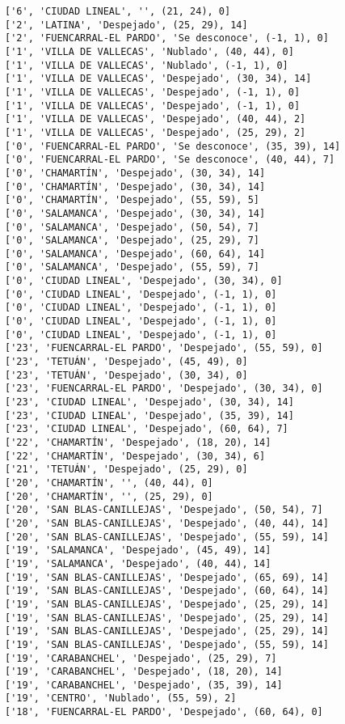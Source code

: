 \documentclass[11pt]{article}
\begin{document}
\begin{Verbatim}[commandchars=\\\{\}]
['6', 'CIUDAD LINEAL', '', (21, 24), 0]
['2', 'LATINA', 'Despejado', (25, 29), 14]
['2', 'FUENCARRAL-EL PARDO', 'Se desconoce', (-1, 1), 0]
['1', 'VILLA DE VALLECAS', 'Nublado', (40, 44), 0]
['1', 'VILLA DE VALLECAS', 'Nublado', (-1, 1), 0]
['1', 'VILLA DE VALLECAS', 'Despejado', (30, 34), 14]
['1', 'VILLA DE VALLECAS', 'Despejado', (-1, 1), 0]
['1', 'VILLA DE VALLECAS', 'Despejado', (-1, 1), 0]
['1', 'VILLA DE VALLECAS', 'Despejado', (40, 44), 2]
['1', 'VILLA DE VALLECAS', 'Despejado', (25, 29), 2]
['0', 'FUENCARRAL-EL PARDO', 'Se desconoce', (35, 39), 14]
['0', 'FUENCARRAL-EL PARDO', 'Se desconoce', (40, 44), 7]
['0', 'CHAMARTÍN', 'Despejado', (30, 34), 14]
['0', 'CHAMARTÍN', 'Despejado', (30, 34), 14]
['0', 'CHAMARTÍN', 'Despejado', (55, 59), 5]
['0', 'SALAMANCA', 'Despejado', (30, 34), 14]
['0', 'SALAMANCA', 'Despejado', (50, 54), 7]
['0', 'SALAMANCA', 'Despejado', (25, 29), 7]
['0', 'SALAMANCA', 'Despejado', (60, 64), 14]
['0', 'SALAMANCA', 'Despejado', (55, 59), 7]
['0', 'CIUDAD LINEAL', 'Despejado', (30, 34), 0]
['0', 'CIUDAD LINEAL', 'Despejado', (-1, 1), 0]
['0', 'CIUDAD LINEAL', 'Despejado', (-1, 1), 0]
['0', 'CIUDAD LINEAL', 'Despejado', (-1, 1), 0]
['0', 'CIUDAD LINEAL', 'Despejado', (-1, 1), 0]
['23', 'FUENCARRAL-EL PARDO', 'Despejado', (55, 59), 0]
['23', 'TETUÁN', 'Despejado', (45, 49), 0]
['23', 'TETUÁN', 'Despejado', (30, 34), 0]
['23', 'FUENCARRAL-EL PARDO', 'Despejado', (30, 34), 0]
['23', 'CIUDAD LINEAL', 'Despejado', (30, 34), 14]
['23', 'CIUDAD LINEAL', 'Despejado', (35, 39), 14]
['23', 'CIUDAD LINEAL', 'Despejado', (60, 64), 7]
['22', 'CHAMARTÍN', 'Despejado', (18, 20), 14]
['22', 'CHAMARTÍN', 'Despejado', (30, 34), 6]
['21', 'TETUÁN', 'Despejado', (25, 29), 0]
['20', 'CHAMARTÍN', '', (40, 44), 0]
['20', 'CHAMARTÍN', '', (25, 29), 0]
['20', 'SAN BLAS-CANILLEJAS', 'Despejado', (50, 54), 7]
['20', 'SAN BLAS-CANILLEJAS', 'Despejado', (40, 44), 14]
['20', 'SAN BLAS-CANILLEJAS', 'Despejado', (55, 59), 14]
['19', 'SALAMANCA', 'Despejado', (45, 49), 14]
['19', 'SALAMANCA', 'Despejado', (40, 44), 14]
['19', 'SAN BLAS-CANILLEJAS', 'Despejado', (65, 69), 14]
['19', 'SAN BLAS-CANILLEJAS', 'Despejado', (60, 64), 14]
['19', 'SAN BLAS-CANILLEJAS', 'Despejado', (25, 29), 14]
['19', 'SAN BLAS-CANILLEJAS', 'Despejado', (25, 29), 14]
['19', 'SAN BLAS-CANILLEJAS', 'Despejado', (25, 29), 14]
['19', 'SAN BLAS-CANILLEJAS', 'Despejado', (55, 59), 14]
['19', 'CARABANCHEL', 'Despejado', (25, 29), 7]
['19', 'CARABANCHEL', 'Despejado', (18, 20), 14]
['19', 'CARABANCHEL', 'Despejado', (35, 39), 14]
['19', 'CENTRO', 'Nublado', (55, 59), 2]
['18', 'FUENCARRAL-EL PARDO', 'Despejado', (60, 64), 0]

\end{Verbatim}
\end{document}

